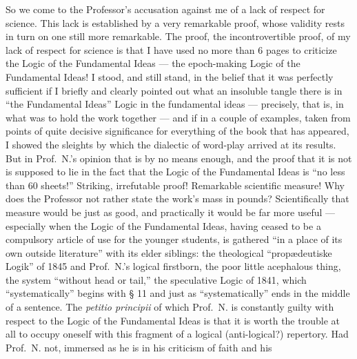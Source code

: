 \documentclass[12pt,a4paper]{book}
\begin{document}
So we come to the Professor's accusation against me of a lack of respect for
science. This lack is established by a very remarkable proof, whose validity
rests in turn on one still more remarkable. The proof, the incontrovertible
proof, of my lack of respect for science is that I have used no more than 6 pages
to criticize the Logic of the Fundamental Ideas --- the epoch-making Logic of the
Fundamental Ideas! I stood, and still stand, in the belief that it was perfectly
sufficient if I briefly and clearly pointed out what an insoluble tangle there is
in ``the Fundamental Ideas'' Logic in the fundamental ideas --- precisely, that
is, in what was to hold the work together --- and if in a couple of examples,
taken from points of quite decisive significance for everything of the book that
has appeared, I showed the sleights by which the dialectic of word-play arrived
at its results. But in Prof.\ N.'s opinion that is by no means enough, and the
proof that it is not is supposed to lie in the fact that the Logic of the
Fundamental Ideas is ``no less than 60 sheets!'' Striking, irrefutable proof!
Remarkable scientific measure! Why does the Professor not rather state the work's
mass in pounds? Scientifically that measure would be just as good, and
practically it would be far more useful --- especially when the Logic of the
Fundamental Ideas, having ceased to be a compulsory article of use for the
younger students, is gathered ``in a place of its own outside literature'' with
its elder siblings: the theological ``propædeutiske Logik'' of 1845 and Prof.\
N.'s logical firstborn, the poor
little acephalous thing, the system ``without head or tail,'' the speculative
Logic of 1841, which ``systematically'' begins with § 11 and just as
``systematically'' ends in the middle of a sentence. The \textit{petitio
principii} of which Prof.\ N. is constantly guilty
with respect to the Logic of the Fundamental Ideas is that it is worth the
trouble at all to occupy oneself with this fragment of a logical (anti-logical?)
repertory. Had Prof.\ N. not, immersed as he is in his criticism of faith and his
\end{document}
